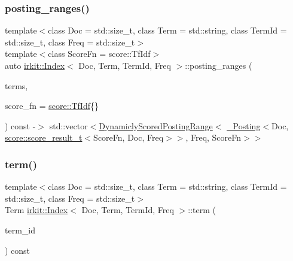 \subsubsection{\texorpdfstring{posting\+\_\+ranges()}{posting\_ranges()}}
{\footnotesize\ttfamily template$<$class Doc  = std\+::size\+\_\+t, class Term  = std\+::string, class Term\+Id  = std\+::size\+\_\+t, class Freq  = std\+::size\+\_\+t$>$ \\
template$<$class Score\+Fn  = score\+::\+Tf\+Idf$>$ \\
auto \mbox{\hyperlink{classirkit_1_1Index}{irkit\+::\+Index}}$<$ Doc, Term, Term\+Id, Freq $>$\+::posting\+\_\+ranges (\begin{DoxyParamCaption}\item[{const std\+::vector$<$ std\+::string $>$ \&}]{terms,  }\item[{Score\+Fn}]{score\+\_\+fn = {\ttfamily \mbox{\hyperlink{structirkit_1_1score_1_1TfIdf}{score\+::\+Tf\+Idf}}\{\}} }\end{DoxyParamCaption}) const -\/$>$ std\+::vector$<$\mbox{\hyperlink{classirkit_1_1DynamiclyScoredPostingRange}{Dynamicly\+Scored\+Posting\+Range}}$<$
            \mbox{\hyperlink{structirkit_1_1__Posting}{\+\_\+\+Posting}}$<$Doc, \mbox{\hyperlink{namespaceirkit_1_1score_ab6226695d6d5c54c84fcf2cb8e90c8b3}{score\+::score\+\_\+result\+\_\+t}}$<$Score\+Fn, Doc, Freq$>$$>$,
            Freq,
            Score\+Fn$>$$>$
    \hspace{0.3cm}{\ttfamily [inline]}}

\mbox{\label{classirkit_1_1Index_a62050b0a8c8556262b82a45be1ae0262}} 
\subsubsection{\texorpdfstring{term()}{term()}}
{\footnotesize\ttfamily template$<$class Doc  = std\+::size\+\_\+t, class Term  = std\+::string, class Term\+Id  = std\+::size\+\_\+t, class Freq  = std\+::size\+\_\+t$>$ \\
Term \mbox{\hyperlink{classirkit_1_1Index}{irkit\+::\+Index}}$<$ Doc, Term, Term\+Id, Freq $>$\+::term (\begin{DoxyParamCaption}\item[{Term\+Id}]{term\+\_\+id }\end{DoxyParamCaption}) const\hspace{0.3cm}{\ttfamily [inline]}}

